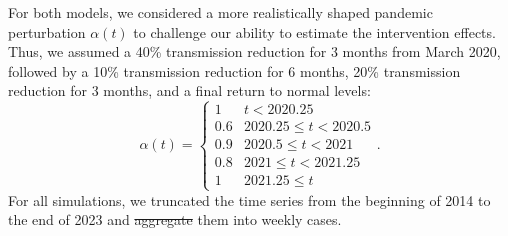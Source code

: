 \documentclass[12pt]{article}
\providecommand{\DIFaddtex}[1]{{\protect\color{blue}\uwave{#1}}} %
\providecommand{\DIFdeltex}[1]{{\protect\color{red}\sout{#1}}}                      %
\providecommand{\DIFaddbegin}{} %
\providecommand{\DIFaddend}{} %
\providecommand{\DIFdelbegin}{} %
\providecommand{\DIFdelend}{} %
\providecommand{\DIFadd}[1]{\texorpdfstring{\DIFaddtex{#1}}{#1}} %
\providecommand{\DIFdel}[1]{\texorpdfstring{\DIFdeltex{#1}}{}} %
\newcommand{\DIFscaledelfig}{0.5}
\newlength{\DIFdelgraphicswidth} %
\newlength{\DIFdelgraphicsheight} %
\newcommand{\DIFaddincludegraphics}[2][]{{\color{blue}\fbox{\DIFOincludegraphics[#1]{#2}}}} %
\newcommand{\DIFdelincludegraphics}[2][]{%
\sbox{\DIFdelgraphicsbox}{\DIFOincludegraphics[#1]{#2}}%
\settoboxwidth{\DIFdelgraphicswidth}{\DIFdelgraphicsbox} %
\settoboxtotalheight{\DIFdelgraphicsheight}{\DIFdelgraphicsbox} %
\scalebox{\DIFscaledelfig}{%
\parbox[b]{\DIFdelgraphicswidth}{\usebox{\DIFdelgraphicsbox}\\[-\baselineskip] \rule{\DIFdelgraphicswidth}{0em}}\llap{\resizebox{\DIFdelgraphicswidth}{\DIFdelgraphicsheight}{%
\setlength{\unitlength}{\DIFdelgraphicswidth}%
\begin{picture}(1,1)%
\thicklines\linethickness{2pt} %
{\color[rgb]{1,0,0}\put(0,0){\framebox(1,1){}}}%
{\color[rgb]{1,0,0}\put(0,0){\line( 1,1){1}}}%
{\color[rgb]{1,0,0}\put(0,1){\line(1,-1){1}}}%
\end{picture}%
}\hspace*{3pt}}} %
} %
\DeclareRobustCommand{\DIFaddbegin}{\DIFOaddbegin \let\includegraphics\DIFaddincludegraphics} %
\DeclareRobustCommand{\DIFaddend}{\DIFOaddend \let\includegraphics\DIFOincludegraphics} %
\DeclareRobustCommand{\DIFdelbegin}{\DIFOdelbegin \let\includegraphics\DIFdelincludegraphics} %
\DeclareRobustCommand{\DIFdelend}{\DIFOaddend \let\includegraphics\DIFOincludegraphics} %
\begin{document}
For both models, we considered a more realistically shaped pandemic perturbation $\alpha(t)$ to challenge our ability to estimate the intervention effects.
Thus, we assumed a 40\% transmission reduction for 3 months from March 2020, followed by a 10\% transmission reduction for 6 months, 20\% transmission reduction for 3 months, and a final return to normal levels:
\begin{equation}
\alpha(t) = \begin{cases}
1 & t < 2020.25\\
0.6 & 2020.25 \leq t < 2020.5\\
0.9 & 2020.5 \leq t < 2021\\
0.8 & 2021 \leq t < 2021.25\\
1 & 2021.25 \leq t
\end{cases}.
\end{equation}
For all simulations, we truncated the time series from the beginning of 2014 to the end of 2023 and \DIFdelbegin \DIFdel{aggregate }\DIFdelend \DIFaddbegin \DIFadd{aggregated }\DIFaddend them into weekly cases.
\end{document}
